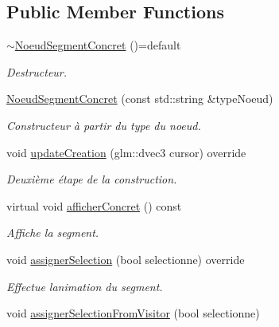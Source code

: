 \subsection*{Public Member Functions}
\begin{DoxyCompactItemize}
\item 
\hypertarget{class_noeud_segment_concret_aae4e7aa019149f71dd6573f57169043f}{}\hyperlink{class_noeud_segment_concret_aae4e7aa019149f71dd6573f57169043f}{$\sim$\+Noeud\+Segment\+Concret} ()=default\label{class_noeud_segment_concret_aae4e7aa019149f71dd6573f57169043f}

\begin{DoxyCompactList}\small\item\em Destructeur. \end{DoxyCompactList}\end{DoxyCompactItemize}
{\bf }\par
\begin{DoxyCompactItemize}
\item 
\hyperlink{class_noeud_segment_concret_a5fa9b4c7e916ecba1afdee2b92b782d0}{Noeud\+Segment\+Concret} (const std\+::string \&type\+Noeud)
\begin{DoxyCompactList}\small\item\em Constructeur à partir du type du noeud. \end{DoxyCompactList}\item 
void \hyperlink{class_noeud_segment_concret_aa2f857b1eb0eb798ffaaedb40da4082d}{update\+Creation} (glm\+::dvec3 cursor) override
\begin{DoxyCompactList}\small\item\em Deuxième étape de la construction. \end{DoxyCompactList}\item 
virtual void \hyperlink{class_noeud_segment_concret_a755c965f09fe2ca3d148812fda08b5d6}{afficher\+Concret} () const 
\begin{DoxyCompactList}\small\item\em Affiche la segment. \end{DoxyCompactList}\item 
void \hyperlink{class_noeud_segment_concret_a5ba94f3e7064c811b9f419db7cc4f0d0}{assigner\+Selection} (bool selectionne) override
\begin{DoxyCompactList}\small\item\em Effectue l\textquotesingle{}animation du segment. \end{DoxyCompactList}\item 
void \hyperlink{class_noeud_segment_concret_abbb904bbc64ac97425c8edb7813a5987}{assigner\+Selection\+From\+Visitor} (bool selectionne)
\end{DoxyCompactItemize}

